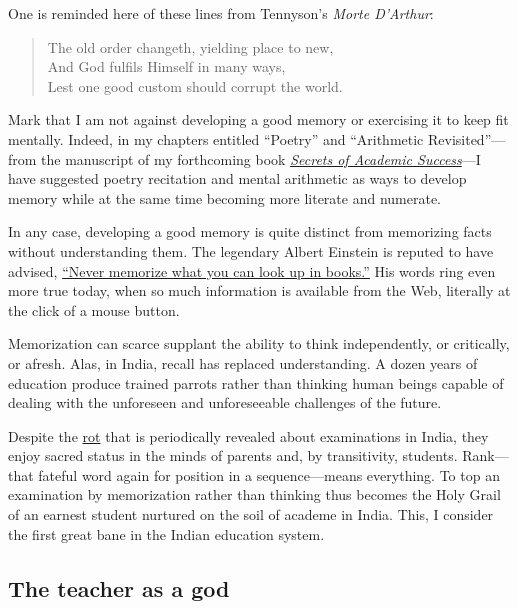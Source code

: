 \documentclass[
  11pt,
  british,
  a4paper,
]{article}
\begin{document}
One is reminded here of these lines from Tennyson's \emph{Morte
D'Arthur}:

\begin{quote}
The old order changeth, yielding place to new,\\
And God fulfils Himself in many ways,\\
Lest one good custom should corrupt the world.
\end{quote}

Mark that I am not against developing a good memory or exercising it to
keep fit mentally. Indeed, in my chapters entitled ``Poetry'' and
``Arithmetic Revisited''---from the manuscript of my forthcoming book
\href{\%7Bstatic\%7D/sas-manuscript/SAS-partial.pdf}{\emph{Secrets of
Academic Success}}---I have suggested poetry recitation and mental
arithmetic as ways to develop memory while at the same time becoming
more literate and numerate.

In any case, developing a good memory is quite distinct from memorizing
facts without understanding them. The legendary Albert Einstein is
reputed to have advised,
\href{http://en.wikiquote.org/wiki/Albert_Einstein}{``Never memorize
what you can look up in books.''} His words ring even more true today,
when so much information is available from the Web, literally at the
click of a mouse button.

Memorization can scarce supplant the ability to think independently, or
critically, or afresh. Alas, in India, recall has replaced
understanding. A dozen years of education produce trained parrots rather
than thinking human beings capable of dealing with the unforeseen and
unforeseeable challenges of the future.

Despite the
\href{http://deedy.quora.com/Hacking-into-the-Indian-Education-System}{rot}
that is periodically revealed about examinations in India, they enjoy
sacred status in the minds of parents and, by transitivity, students.
Rank---that fateful word again for position in a sequence---means
everything. To top an examination by memorization rather than thinking
thus becomes the Holy Grail of an earnest student nurtured on the soil
of academe in India. This, I consider the first great bane in the Indian
education system.

\hypertarget{the-teacher-as-a-god}{%
\subsection{The teacher as a god}\label{the-teacher-as-a-god}}
\end{document}
